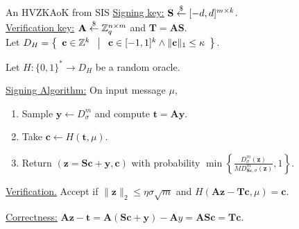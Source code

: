 \begin{frame}{An HVZKAoK from SIS}
	\underline{Signing key:} $\mathbf{S} \stackrel{\$}{\leftarrow} [-d, d]^{m\times k}$.\\
	
	\underline{Verification key:} $\mathbf{A} \stackrel{\$}{\leftarrow} \mathbb{Z}_q^{n \times m}$ and $\mathbf{T} = \mathbf{A}\mathbf{S}$.\\
	
	Let $D_H = \left\{ \begin{array}{c} \mathbf{c} \in \mathbb{Z}^k \end{array}\;\middle|\;\begin{array}{c} \mathbf{c} \in [-1, 1]^k \wedge \lVert\mathbf{c}\rVert_1 \leq \kappa \end{array} \right\}$.
	
	Let $H:\{0,1\}^*\to D_H$ be a random oracle.
	
	\underline{Signing Algorithm:} On input message $\mu$,
	\begin{enumerate}
		\item Sample $\mathbf{y} \leftarrow D^m_\sigma$ and compute $\mathbf{t} = \mathbf{A}\mathbf{y}$.
		\item Take $\mathbf{c} \leftarrow H(\mathbf{t}, \mu)$.
		\item Return $(\mathbf{z} = \mathbf{S}\mathbf{c} + \mathbf{y}, \mathbf{c})$ with probability $\min\left\{\frac{D^m_\sigma(\mathbf{z})}{MD^m_{\mathbf{S}\mathbf{c},\sigma}(\mathbf{z})},1\right\}$.
	\end{enumerate}

	\underline{Verification.} Accept if $\lVert\mathbf{z}\rVert_2 \leq \eta\sigma\sqrt{m}$ and $H(\mathbf{A}\mathbf{z}- \mathbf{T}\mathbf{c}, \mu) = \mathbf{c}$.

	\underline{Correctness:} $\mathbf{A}\mathbf{z} - \mathbf{t} = \mathbf{A}(\mathbf{S}\mathbf{c}+\mathbf{y}) - \mathbf{A}{y} = \mathbf{A}\mathbf{S}\mathbf{c} = \mathbf{T}\mathbf{c}$.
\end{frame}

